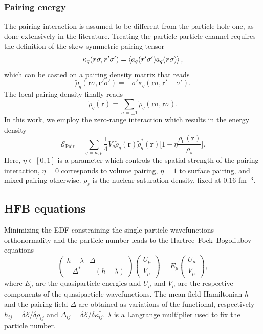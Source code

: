 \documentclass[%
 reprint, linenumbers,
 amsmath,amssymb,
 aps, physrev
]{revtex4-2}
\begin{document}
\subsubsection{Pairing energy}
The pairing interaction is assumed to be different from the particle-hole one, as done extensively in the literature. Treating the particle-particle channel requires the definition of the skew-symmetric pairing tensor
\begin{equation}
\kappa_q (\bm r \sigma, \bm r'\sigma') = \expval{a_q(\bm r'\sigma') a_q(\bm r \sigma)},
\end{equation}
which can be casted on a pairing density matrix that reads
\begin{equation}
\tilde\rho_q(\bm r \sigma, \bm r'\sigma')=-\sigma'\kappa_q(\bm r \sigma, \bm r'-\sigma').
\end{equation}
The local pairing density finally reads 
\begin{equation}
  \label{eq:pairing_density}
\tilde\rho_q(\bm r)=\sum_{\sigma=\pm 1}\tilde\rho_q(\bm r \sigma, \bm r\sigma).
\end{equation}
In this work, we employ the zero-range interaction which results in the energy density~\cite{Bender2003}
\begin{equation}
    \mathcal E_\text{Pair} =\sum_{q=n,p} \frac 1 4 V_{q}\tilde\rho_q(\bm r)\tilde\rho_q^*(\bm r)\bigg[1-\eta\frac{\rho_0(\bm r)}{\rho_s}\bigg].
\end{equation}
Here, $\eta\in[0,1]$ is a parameter which controls the spatial strength of the pairing interaction, $\eta=0$ corresponds to volume pairing, $\eta=1$ to surface pairing, and mixed pairing otherwise. $\rho_s$ is the nuclear saturation density, fixed at $0.16$ fm$^{-3}$.
\subsection{HFB equations}
Minimizing the EDF constraining the single-particle wavefunctions orthonormality and the particle number leads to the Hartree--Fock--Bogoliubov equations
\begin{equation}
  \begin{pmatrix}
    h - \lambda & \Delta \\ -\Delta^* & -(h-\lambda)
  \end{pmatrix}
  \begin{pmatrix}
    U_\mu \\ V_\mu
  \end{pmatrix}
  =E_\mu \begin{pmatrix}
    U_\mu \\ V_\mu
  \end{pmatrix},
  \label{eq:HFB}
\end{equation}
where $E_\mu$ are the quasiparticle energies and $U_\mu$ and $V_\mu$ are the respective components of the quasiparticle wavefunctions. The mean-field Hamiltonian $h$ and the pairing field $\Delta$ are obtained as variations of the functional, respectively $h_{ij} = \delta \mathcal E / \delta \rho_{ij}$ and $\Delta_{ij} = \delta \mathcal E / \delta \kappa^*_{ij}$. 
$\lambda$ is a Langrange multiplier used to fix the particle number.
\end{document}
